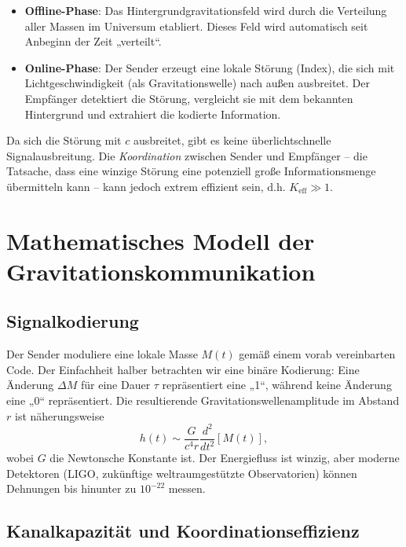 \documentclass[12pt,a4paper]{article}
\newcommand{\Keff}{K_{\mathrm{eff}}}
\begin{document}
	\begin{itemize}
		\item \textbf{Offline-Phase}: Das Hintergrundgravitationsfeld wird durch die Verteilung aller Massen im Universum etabliert. Dieses Feld wird automatisch seit Anbeginn der Zeit „verteilt“.
		\item \textbf{Online-Phase}: Der Sender erzeugt eine lokale Störung (Index), die sich mit Lichtgeschwindigkeit (als Gravitationswelle) nach außen ausbreitet. Der Empfänger detektiert die Störung, vergleicht sie mit dem bekannten Hintergrund und extrahiert die kodierte Information.
	\end{itemize}
	
	Da sich die Störung mit \(c\) ausbreitet, gibt es keine überlichtschnelle Signalausbreitung. Die \emph{Koordination} zwischen Sender und Empfänger – die Tatsache, dass eine winzige Störung eine potenziell große Informationsmenge übermitteln kann – kann jedoch extrem effizient sein, d.h. \(\Keff \gg 1\).
	
	\section{Mathematisches Modell der Gravitationskommunikation}
	\label{sec:model}
	
	\subsection{Signalkodierung}
	
	Der Sender moduliere eine lokale Masse \(M(t)\) gemäß einem vorab vereinbarten Code. Der Einfachheit halber betrachten wir eine binäre Kodierung: Eine Änderung \(\Delta M\) für eine Dauer \(\tau\) repräsentiert eine „1“, während keine Änderung eine „0“ repräsentiert. Die resultierende Gravitationswellenamplitude im Abstand \(r\) ist näherungsweise
	\begin{equation}
		h(t) \sim \frac{G}{c^4 r} \frac{d^2}{dt^2} \left[ M(t) \right],
	\end{equation}
	wobei \(G\) die Newtonsche Konstante ist. Der Energiefluss ist winzig, aber moderne Detektoren (LIGO, zukünftige weltraumgestützte Observatorien) können Dehnungen bis hinunter zu \(10^{-22}\) messen.
	
	\subsection{Kanalkapazität und Koordinationseffizienz}
	
\end{document}
